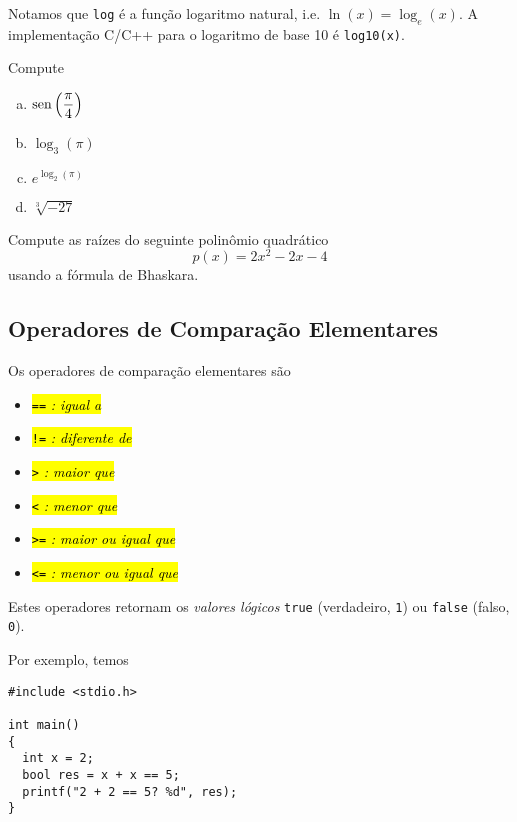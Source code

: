 \documentclass[12pt]{article}
\begin{document}
\begin{obs}
  Notamos que \lstinline+log+ é a função logaritmo natural, i.e. $\ln(x) = \log_e(x)$. A implementação C/C++ para o logaritmo de base 10 é \lstinline!log10(x)!.
\end{obs}

\begin{exr}
  Compute
  \begin{enumerate}[a)]
  \item $\displaystyle \operatorname{sen}\left(\frac{\pi}{4}\right)$
  \item $\displaystyle \log_3(\pi)$
  \item $\displaystyle e^{\log_2(\pi)}$
  \item $\displaystyle \sqrt[3]{-27}$
  \end{enumerate}
\end{exr}

\begin{exr}\label{exr:bhaskara}
  Compute as raízes do seguinte polinômio quadrático
  \begin{equation}
    p(x) = 2x^2 - 2x - 4
  \end{equation}
  usando a fórmula de Bhaskara{\bhaskara}.
\end{exr}

\subsection{Operadores de Comparação Elementares}

Os operadores de comparação elementares são
\begin{itemize}
\item[]\hl{{\lstinline+==+} \emph{: igual a}}
\item[]\hl{{\lstinline+!=+} \emph{: diferente de}}
\item[]\hl{{\lstinline+>+} \emph{: maior que}}
\item[]\hl{{\lstinline+<+} \emph{: menor que}}
\item[]\hl{{\lstinline+>=+} \emph{: maior ou igual que}}
\item[]\hl{{\lstinline+<=+} \emph{: menor ou igual que}}
\end{itemize}
Estes operadores retornam os \emph{valores lógicos} \lstinline!true! (verdadeiro, \lstinline!1!) ou \lstinline!false! (falso, \lstinline!0!).

Por exemplo, temos
\begin{lstlisting}[caption=opComp.cc]
#include <stdio.h>

int main()
{
  int x = 2;
  bool res = x + x == 5;
  printf("2 + 2 == 5? %d", res);
}
\end{lstlisting}
\end{document}
